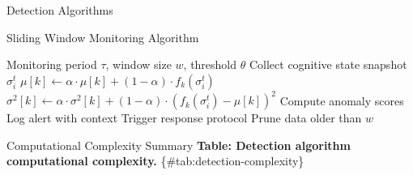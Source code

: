 \documentclass[
  ignorenonframetext,
]{beamer}
\begin{document}
\begin{frame}{Detection Algorithms}
\begin{block}{Sliding Window Monitoring Algorithm}
\protect{}\label{sliding-window-monitoring-algorithm}
\begin{algorithm}
\caption{Sliding Window Monitoring}
\label{alg:sliding-window}
\begin{algorithmic}[1]
\Require Monitoring period $\tau$, window size $w$, threshold $\theta$
\Loop {}
    \State Collect cognitive state snapshot $\sigma_i^t$
        \State $\mu[k] \gets \alpha \cdot \mu[k] + (1-\alpha) \cdot f_k(\sigma_i^t)$
        \State $\sigma^2[k] \gets \alpha \cdot \sigma^2[k] + (1-\alpha) \cdot (f_k(\sigma_i^t) - \mu[k])^2$
    \EndFor
    \State Compute anomaly scores
        \State Log alert with context
        \State Trigger response protocol
    \EndIf
    \State Prune data older than $w$
\EndLoop
\end{algorithmic}
\end{algorithm}
\end{block}

\begin{block}{Computational Complexity Summary}
\protect{}\label{sec:detection-complexity}
\textbf{Table: Detection algorithm computational complexity.}
\{\#tab:detection-complexity\}


\end{block}
\end{frame}
\end{document}
